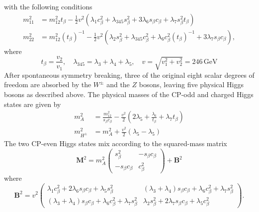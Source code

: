 with the following conditions
\begin{equation}
    \label{4.4}
    \begin{split}
        m_{11}^2 &= m_{12}^2 t_{\beta} - \frac{1}{2}v^2(\lambda_1  c^2_{\beta} + \lambda_{345} s^2_{\beta} + 3\lambda_6 s_{\beta} c_{\beta} + \lambda_7  s^2_{\beta} t_{\beta})  \\
        m_{22}^2 &= m_{12}^2( t_{\beta})^{-1} - \frac{1}{2}v^2(\lambda_2  s^2_{\beta} + \lambda_{345} c^2_{\beta} + \lambda_6 c^2_{\beta}( t_{\beta})^{-1} + 3\lambda_7  s_{\beta} c_{\beta}  ),
    \end{split}
\end{equation}
where 
$$ t_{\beta}=\frac{v_2}{v_1}, \quad \lambda_{345} = \lambda_3+\lambda_4+\lambda_5, \quad v = \sqrt{v_1^2 + v_2^2} = 246\, \mathrm{GeV}$$
After spontaneous symmetry breaking, three of the original eight scalar degrees of freedom are absorbed by the $W^{\pm}$ and the $Z$ bosons, leaving five physical Higgs bosons as described above. The physical masses of the CP-odd and charged Higgs states are given by 
\begin{equation}
    \label{4.5}
    \begin{split}
        m^2_{A} &= \frac{m_{12}^2}{ s_{\beta} c_{\beta}} - \frac{v^2}{2}\left( 2\lambda_5 + \frac{\lambda_6}{ t_{\beta}} + \lambda_7  t_{\beta}  \right) \\ 
        m^2_{H^{\pm}} &= m_{A}^2 + \frac{v^2}{2}(\lambda_5 - \lambda_5)
    \end{split}
\end{equation}
The two CP-even Higgs states mix according to the squared-mass matrix 
\begin{equation}
    \label{4.6}
    \mathbf{M}^2 = m^2_{A}\begin{pmatrix}
         s^2_{\beta} & - s_{\beta}  c_{\beta} \\
        - s_{\beta} c_{\beta} &  c^2_{\beta} 
    \end{pmatrix} + \mathbf{B}^2
\end{equation}
where
$$\mathbf{B}^2 = v^2\begin{pmatrix}
    \lambda_1 c^2_{\beta} + 2 \lambda_6 s_{\beta} c_{\beta} + \lambda_5 s^2_{\beta}  & (\lambda_3+\lambda_4) s_{\beta} c_{\beta} + \lambda_6 c^2_{\beta} + \lambda_7  s^2_{\beta} \\
    (\lambda_3 + \lambda_4) s_{\beta} c_{\beta} + \lambda_6 c^2_{\beta} + \lambda_7 s^2_{\beta} & \lambda_2 s^2_{\beta} + 2 \lambda_7 s_{\beta} c_{\beta} + \lambda_5 c^2_{\beta} 
\end{pmatrix}.$$
